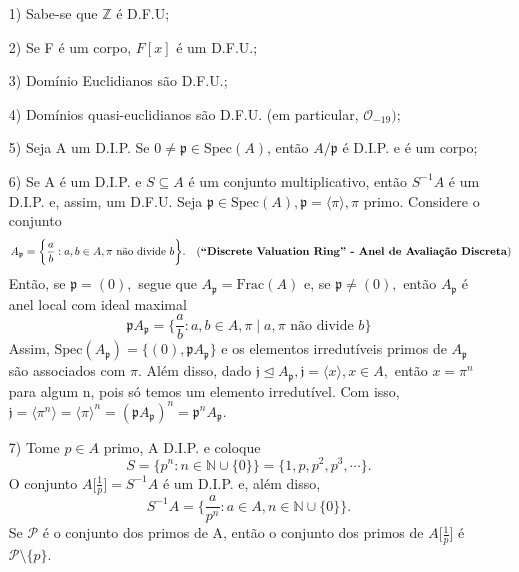 \documentclass[AlgebraII/algebraII_notes.tex]{subfiles}
\begin{document}
\begin{example}
	\begin{itemize}
		\item[1)] Sabe-se que \(\mathbb{Z}\) é D.F.U;
		\item[2)] Se F é um corpo, \(F[x]\) é um D.F.U.;
		\item[3)] Domínio Euclidianos são D.F.U.;
		\item[4)] Domínios quasi-euclidianos são D.F.U. (em particular, \(\mathcal{O}_{-19})\);
		\item[5)] Seja A um D.I.P. Se \(0\neq\mathfrak{p}\in \mathrm{Spec}(A)\), então \(A/\mathfrak{p}\) é D.I.P. e é um corpo;
		\item[6)] Se A é um D.I.P. e \(S\subseteq{A}\) é um conjunto multiplicativo, então \(S^{-1}A\) é um D.I.P. e, assim, um D.F.U. Seja \(\mathfrak{p}\in \mathrm{Spec}(A), \mathfrak{p} = \langle \pi  \rangle, \pi\) primo. Considere o conjunto
		      \[
			      A_{\mathfrak{p}} = \biggl\{\frac{a}{b}: a, b \in A, \pi \text{ não divide } b\biggr\}.\quad \text{(\textbf{``Discrete Valuation Ring'' - Anel de Avaliação Discreta})}
		      \]
		      Então, se \(\mathfrak{p} = (0),\) segue que \(A_{\mathfrak{p}} = \mathrm{Frac}(A)\) e, se \(\mathfrak{p}\neq (0),\) então
		      \(A_{\mathfrak{p}}\) é anel local com ideal maximal
		      \[
			      \mathfrak{p}A_{\mathfrak{p}} = \biggl\{\frac{a}{b}: a,b\in A, \pi \mid a, \pi \text{ não divide } b\biggr\}
		      \]
		      Assim, \(\mathrm{Spec}(A_{\mathfrak{p}}) = \{(0), \mathfrak{p}A_{\mathfrak{p}}\}\) e os elementos irredutíveis primos de \(A_{\mathfrak{p}}\)
		      são associados com \(\pi \). Além disso, dado \(\mathfrak{j}\trianglelefteq{A_{\mathfrak{p}}}, \mathfrak{j} = \langle x \rangle, x\in A,\) então
		      \(x = \pi ^{n}\) para algum n, pois só temos um elemento irredutível. Com isso, \(\mathfrak{j} = \langle \pi ^{n} \rangle = \langle \pi  \rangle^{n} = (\mathfrak{p}A_{\mathfrak{p}})^{n} = \mathfrak{p}^{n}A_{\mathfrak{p}}\).
		\item[7)] Tome \(p\in A\) primo, A D.I.P. e coloque
		      \[
			      S = \{p^{n}: n\in \mathbb{N}\cup \{0\}\} = \{1, p, p^{2}, p^{3}, \cdots\}.
		      \]
		      O conjunto \(A \biggl[\frac{1}{p}\biggr] = S^{-1}A\) é um D.I.P. e, além disso,
		      \[
			      S^{-1}A = \biggl\{\frac{a}{p^{n}}:a\in A, n\in \mathbb{N}\cup\{0\}\biggr\}.
		      \]
		      Se \(\mathcal{P}\) é o conjunto dos primos de A, então o conjunto dos primos de \(A \biggl[\frac{1}{p}\biggr]\) é
		      \(\mathcal{P}\setminus{\{p\}}\).
	\end{itemize}
\end{example}
\end{document}
